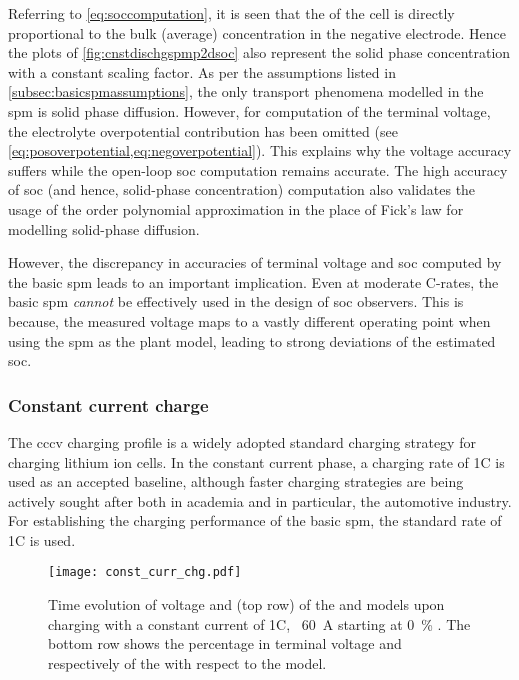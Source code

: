 Referring to \cref{eq:soccomputation}, it is  seen that the  of
the cell  is directly proportional  to the  bulk (average) concentration  in the
negative  electrode.  Hence  the  plots  of \cref{fig:cnstdischgspmp2dsoc}  also
represent the solid  phase concentration with a constant scaling  factor. As per
the assumptions listed  in \cref{subsec:basicspmassumptions}, the only transport
phenomena  modelled in  the \gls{spm}  is  solid phase  diffusion. However,  for
computation of the terminal  voltage, the electrolyte overpotential contribution
has  been   omitted  (see \cref{eq:posoverpotential,eq:negoverpotential}).  This
explains  why  the  voltage  accuracy  suffers  while  the  open-loop  \gls{soc}
computation  remains  accurate.  The  high accuracy  of  \gls{soc}  (and  hence,
solid-phase  concentration)   computation  also  validates  the   usage  of  the
 order polynomial  approximation in the place of  Fick's law for
modelling solid-phase diffusion.

However,  the  discrepancy  in  accuracies of  terminal  voltage  and  \gls{soc}
computed  by the  basic \gls{spm}  leads to  an important  implication. Even  at
moderate C-rates, the  basic \gls{spm} \emph{cannot} be effectively  used in the
design of \gls{soc}  observers. This is because, the measured  voltage maps to a
vastly different  operating point when using  the \gls{spm} as the  plant model,
leading to strong deviations of the estimated \gls{soc}.


\subsubsection*{Constant current charge}\label{subsubsec:cnstcurrchgsim}

The \gls{cccv} charging  profile is a widely adopted  standard charging strategy
for charging lithium  ion cells. In the constant current  phase, a charging rate
of 1C is  used as an accepted baseline, although  faster charging strategies are
being actively sought  after both in academia and in  particular, the automotive
industry. For establishing the charging performance of the basic \gls{spm}, the
standard rate of 1C is used.

\begin{figure}[!htbp]
    \centering
    \texttt{[image: const\_curr\_chg.pdf]}
    \caption[Voltage and  computed by  and
     for 1C constant current charge]{Time evolution of voltage
        and  (top row) of the  and
         models upon charging with a constant current of 1C,
        \ie~\SI{60}{\ampere} starting at \SI{0}{\percent} .
        The bottom row shows the percentage in terminal voltage and
         respectively of the  with respect to
    the  model.}
    \label{fig:cnstchgspmp2d}
\end{figure}

